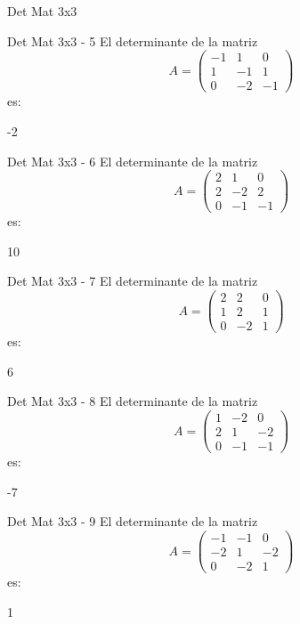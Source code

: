 \documentclass[a4,11pt]{aleph-notas}
\begin{document}
\begin{quiz}{Det Mat 3x3}
\begin{numerical}[tolerance=0]%
    {Det Mat 3x3 - 5}
    El determinante de la matriz
    \[
        A = \begin{pmatrix} -1 & 1 & 0 \\ 1 & -1 & 1 \\ 0 & -2 & -1 \end{pmatrix}
    \]
    es:
    \item[] -2
\end{numerical}

\begin{numerical}[tolerance=0]%
    {Det Mat 3x3 - 6}
    El determinante de la matriz
    \[
        A = \begin{pmatrix} 2 & 1 & 0 \\ 2 & -2 & 2 \\ 0 & -1 & -1 \end{pmatrix}
    \]
    es:
    \item[] 10
\end{numerical}

\begin{numerical}[tolerance=0]%
    {Det Mat 3x3 - 7}
    El determinante de la matriz
    \[
        A = \begin{pmatrix} 2 & 2 & 0 \\ 1 & 2 & 1 \\ 0 & -2 & 1 \end{pmatrix}
    \]
    es:
    \item[] 6
\end{numerical}

\begin{numerical}[tolerance=0]%
    {Det Mat 3x3 - 8}
    El determinante de la matriz
    \[
        A = \begin{pmatrix} 1 & -2 & 0 \\ 2 & 1 & -2 \\ 0 & -1 & -1 \end{pmatrix}
    \]
    es:
    \item[] -7
\end{numerical}

\begin{numerical}[tolerance=0]%
    {Det Mat 3x3 - 9}
    El determinante de la matriz
    \[
        A = \begin{pmatrix} -1 & -1 & 0 \\ -2 & 1 & -2 \\ 0 & -2 & 1 \end{pmatrix}
    \]
    es:
    \item[] 1
\end{numerical}


\end{quiz}
\end{document}
